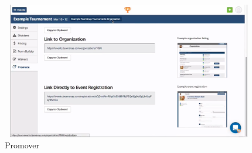	\begin{figure}[hbt]
		\centering
		\includegraphics[width=12cm, height=6cm]{Imagenes/Aplicaciones/TsT3.png}
		\caption{Promover}
	\end{figure}
	\pagebreak
	
	

